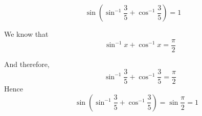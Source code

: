 \documentclass[14pt,fleqn]{extarticle}
\newcommand\f{\frac{3}{5}}
\begin{document}
 
\begin{snippet}
    \correct
    
    \[ \sin \left(\sin^{-1}\f + \cos^{-1}\f \right) = 1 \]
    
    \reason
    
    We know that 
    \[ \qquad \sin^{-1}x + \cos^{-1} x = \frac\pi{2} \]
    
    And therefore, 
    \[ \qquad \sin^{-1} \f + \cos^{-1} \f = \frac\pi{2} \]
    Hence 
    \[ \quad \sin \left(\sin^{-1}\f + \cos^{-1}\f\right) = \sin\frac\pi{2} = 1\]
    
\end{snippet} 
\end{document}

